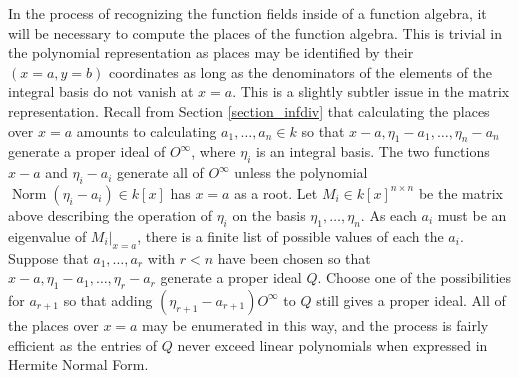 \documentclass[12pt,reqno]{amsart}
\numberwithin{equation}{section}
\newcommand{\op}[1]  { \operatorname{ #1 }}
\begin{document}
In the process of recognizing the function fields inside of a function algebra, it will be necessary to compute the places of the function algebra. This is trivial in the polynomial representation as places may be identified by their $(x=a,y=b)$ coordinates as long as the denominators of the elements of the integral basis do not vanish at $x=a$. This is a slightly subtler issue in the matrix representation. Recall from Section \ref{section_infdiv} that calculating the places over $x=a$ amounts to calculating $a_1,\dots,a_n \in k$ so that $x-a,\eta_1-a_1,\dots,\eta_n-a_n$ generate a proper ideal of $O^{\infty}$, where $\eta_i$ is an integral basis. The two functions $x-a$ and $\eta_i-a_i$ generate all of $O^{\infty}$ unless the polynomial $\op{Norm}(\eta_i-a_i) \in k[x]$ has $x=a$ as a root. Let $M_i \in k[x]^{n \times n}$ be the matrix above describing the operation of $\eta_i$ on the basis $\eta_1,\dots,\eta_n$. As each $a_i$ must be an eigenvalue of $M_i|_{x=a}$, there is a finite list of possible values of each the $a_i$. Suppose that $a_1,\dots,a_r$ with $r<n$ have been chosen so that $x-a,\eta_1-a_1,\dots,\eta_r-a_r$ generate a proper ideal $Q$. Choose one of the possibilities for $a_{r+1}$ so that adding $(\eta_{r+1}-a_{r+1})O^{\infty}$ to $Q$ still gives a proper ideal. All of the places over $x=a$ may be enumerated in this way, and the process is fairly efficient as the entries of $Q$ never exceed linear polynomials when expressed in Hermite Normal Form.
\end{document}
